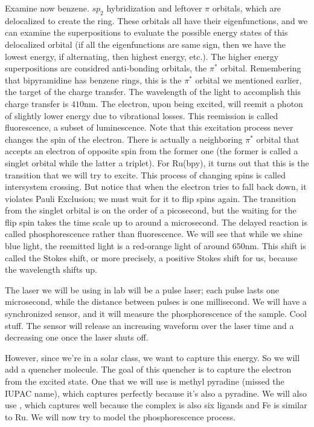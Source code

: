 \documentclass{report}
\begin{document}
Examine now benzene. $sp_2$ hybridization and leftover $\pi$ orbitals, which are delocalized to create the ring. These orbitals all have their eigenfunctions, and we can examine the superpositions to evaluate the possible energy states of this delocalized orbital (if all the eigenfunctions are same sign, then we have the lowest energy, if alternating, then highest energy, etc.). The higher energy superpositions are considred anti-bonding orbitals, the $\pi^*$ orbital. Remembering that bipyramidine has benzene rings, this is the $\pi^*$ orbital we mentioned earlier, the target of the charge transfer. The wavelength of the light to accomplish this charge transfer is $410$nm. The electron, upon being excited, will reemit a photon of slightly lower energy due to vibrational losses. This reemission is called fluorescence, a subset of luminescence. Note that this excitation process never changes the spin of the electron. There is actually a neighboring $\pi^*$ orbital that accepts an electron of opposite spin from the former one (the former is called a singlet orbital while the latter a triplet). For Ru(bpy), it turns out that this is the transition that we will try to excite. This process of changing spins is called intersystem crossing. But notice that when the electron tries to fall back down, it violates Pauli Exclusion; we must wait for it to flip spins again. The transition from the singlet orbital is on the order of a picosecond, but the waiting for the flip spin takes the time scale up to around a microsecond. The delayed reaction is called phosphorescence rather than fluorescence. We will see that while we shine blue light, the reemitted light is a red-orange light of around $650$nm. This shift is called the Stokes shift, or more precisely, a positive Stokes shift for us, because the wavelength shifts up. 

The laser we will be using in lab will be a pulse laser; each pulse lasts one microsecond, while the distance between pulses is one millisecond. We will have a synchronized sensor, and it will measure the phosphorescence of the sample. Cool stuff. The sensor will release an increasing waveform over the laser time and a decreasing one once the laser shuts off.

However, since we're in a solar class, we want to capture this energy. So we will add a quencher molecule. The goal of this quencher is to capture the electron from the excited state. One that we will use is methyl pyradine (missed the IUPAC name), which captures perfectly because it's also a pyradine. We will also use , which captures well because the complex is also six ligands and Fe is similar to Ru. We will now try to model the phosphorescence process.
\end{document}
